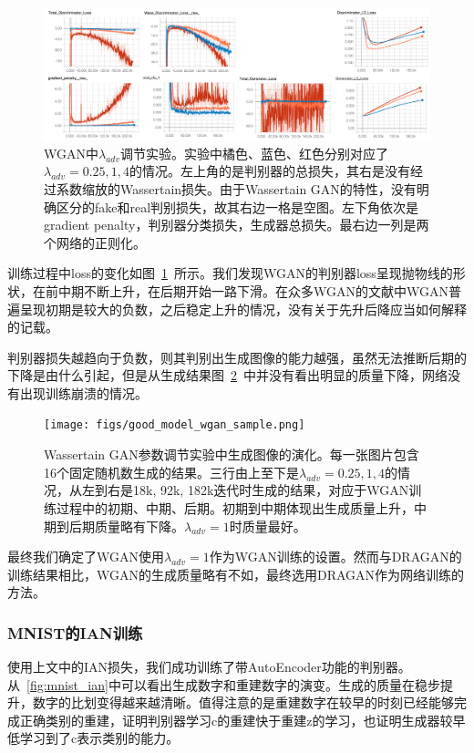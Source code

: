 \documentclass[a4paper,12pt,UTF8]{ctexart}
\newcommand{\kai}{\CJKfamily{zhkai}}	%
\begin{document}
\begin{figure}[H]
  \centering
  \includegraphics[width=1\linewidth]{figs/good_model_wgan.png}
  \caption{\kai WGAN中$\lambda_{adv}$调节实验。实验中橘色、蓝色、红色分别对应了$\lambda_{adv}=0.25, 1, 4$的情况。左上角的是判别器的总损失，其右是没有经过系数缩放的Wassertain损失。由于Wassertain GAN的特性，没有明确区分的fake和real判别损失，故其右边一格是空图。左下角依次是gradient penalty，判别器分类损失，生成器总损失。最右边一列是两个网络的正则化。}
  \label{fig:goodmodel_wgan}
\end{figure}

训练过程中loss的变化如图~\ref{fig:goodmodel_wgan}~所示。我们发现WGAN的判别器loss呈现抛物线的形状，在前中期不断上升，在后期开始一路下滑。在众多WGAN的文献中WGAN普遍呈现初期是较大的负数，之后稳定上升的情况，没有关于先升后降应当如何解释的记载。

判别器损失越趋向于负数，则其判别出生成图像的能力越强，虽然无法推断后期的下降是由什么引起，但是从生成结果图~\ref{fig:wgan_evolve}~中并没有看出明显的质量下降，网络没有出现训练崩溃的情况。

\begin{figure}[H]
  \centering
  \texttt{[image: figs/good\_model\_wgan\_sample.png]}
  \caption{\kai Wassertain GAN参数调节实验中生成图像的演化。每一张图片包含16个固定随机数生成的结果。三行由上至下是$\lambda_{adv}=0.25, 1, 4$的情况，从左到右是18k, 92k, 182k迭代时生成的结果，对应于WGAN训练过程中的初期、中期、后期。初期到中期体现出生成质量上升，中期到后期质量略有下降。$\lambda_{adv}=1$时质量最好。}
  \label{fig:wgan_evolve}
\end{figure}

最终我们确定了WGAN使用$\lambda_{adv}=1$作为WGAN训练的设置。然而与DRAGAN的训练结果相比，WGAN的生成质量略有不如，最终选用DRAGAN作为网络训练的方法。

\subsubsection{MNIST的IAN训练}

使用上文中的IAN损失，我们成功训练了带AutoEncoder功能的判别器。从~\ref{fig:mnist_ian}中可以看出生成数字和重建数字的演变。生成的质量在稳步提升，数字的比划变得越来越清晰。值得注意的是重建数字在较早的时刻已经能够完成正确类别的重建，证明判别器学习c的重建快于重建z的学习，也证明生成器较早低学习到了c表示类别的能力。
\end{document}
